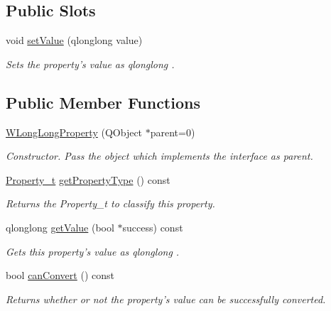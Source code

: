 \subsection*{Public Slots}
\begin{DoxyCompactItemize}
\item 
void \hyperlink{class_w_long_long_property_aef758f4156c156c6a4750f81fd673f65}{set\-Value} (qlonglong value)
\begin{DoxyCompactList}\small\item\em Sets the property's value as qlonglong . \end{DoxyCompactList}\end{DoxyCompactItemize}
\subsection*{Public Member Functions}
\begin{DoxyCompactItemize}
\item 
\hyperlink{class_w_long_long_property_a9005bf9802f0368cacd6d81e77abb514}{W\-Long\-Long\-Property} (Q\-Object $\ast$parent=0)
\begin{DoxyCompactList}\small\item\em Constructor. Pass the object which implements the interface as parent. \end{DoxyCompactList}\item 
\hyperlink{group___property_classes_ga38f1ccddda12c7cb50b868c9f789ee37}{Property\-\_\-t} \hyperlink{class_w_long_long_property_ac301629b3dfc952f2de2f1eafd82b31c}{get\-Property\-Type} () const 
\begin{DoxyCompactList}\small\item\em Returns the Property\-\_\-t to classify this property. \end{DoxyCompactList}\item 
qlonglong \hyperlink{class_w_long_long_property_abae79b01d411ec7f44aa2d93289ad63f}{get\-Value} (bool $\ast$success) const 
\begin{DoxyCompactList}\small\item\em Gets this property's value as qlonglong . \end{DoxyCompactList}\item 
bool \hyperlink{class_w_long_long_property_a5b553e3d82d48cb661ef6180fa8ed76e}{can\-Convert} () const 
\begin{DoxyCompactList}\small\item\em Returns whether or not the property's value can be successfully converted. \end{DoxyCompactList}\end{DoxyCompactItemize}
